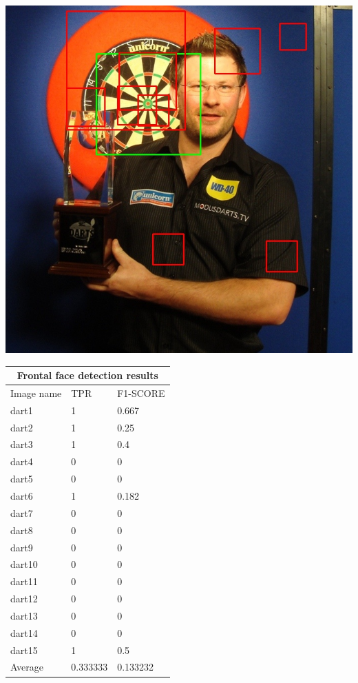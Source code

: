 \documentclass{article}
\begin{document}
\begin{multicols}{2}
\begin{multicols}{3}
    \includegraphics[width=\linewidth]{dart4-dart.jpg}\par
\end{multicols}
\label{fig:vjdartsimages}


\begin{tabular}{ |p{2cm}||p{2cm}|p{2cm}| }
 \hline
 \multicolumn{3}{|c|}{Frontal face detection results} \\
 \hline
 Image name & TPR & F1-SCORE \\
 \hline
 dart1  & 1  & 0.667   \\
 dart2  & 1  & 0.25       \\
 dart3  & 1  & 0.4        \\
 dart4  & 0  & 0          \\
 dart5  & 0  & 0          \\
 dart6  & 1  & 0.182   \\
 dart7  & 0  & 0          \\
 dart8  & 0  & 0          \\
 dart9  & 0  & 0          \\
 dart10 & 0  & 0          \\
 dart11 & 0  & 0          \\
 dart12 & 0  & 0          \\
 dart13 & 0  & 0          \\
 dart14 & 0  & 0          \\
 dart15 & 1  & 0.5        \\
 \hline
 Average& 0.333333  & 0.133232    \\ 
 \hline
\end{tabular}
\label{tab:vjdartstable}


\end{multicols}
\end{document}
